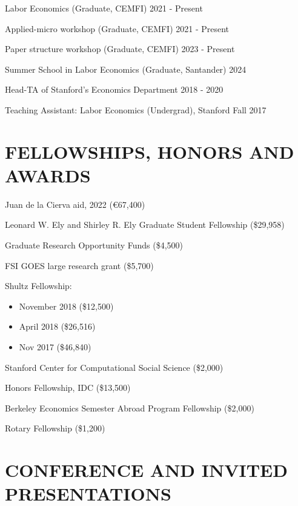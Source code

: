 \documentclass[margin]{res} %
\begin{document}
\begin{resume}
Labor Economics (Graduate, CEMFI) \hfill 2021 - Present

Applied-micro workshop (Graduate, CEMFI) \hfill 2021 - Present

Paper structure workshop (Graduate, CEMFI) \hfill 2023 - Present

Summer School in Labor Economics (Graduate, Santander) \hfill 2024

Head-TA of Stanford's Economics Department \hfill 2018 - 2020

Teaching Assistant: Labor Economics (Undergrad), Stanford \hfill Fall 2017



\section{FELLOWSHIPS, HONORS AND AWARDS}
		
		Juan de la Cierva aid, 2022 (\euro{67,400})

		 Leonard W. Ely and Shirley R. Ely Graduate Student Fellowship (\$29,958)

     Graduate Research Opportunity Funds (\$4,500)

     FSI GOES large research grant (\$5,700)

     Shultz Fellowship:
     \begin{itemize}
     	\item November 2018 (\$12,500)
     	\item April 2018 (\$26,516)
     	\item Nov 2017 (\$46,840)
     \end{itemize}

		 Stanford Center for Computational Social Science (\$2,000) 

		 Honors Fellowship, IDC (\$13,500) 

		 Berkeley Economics Semester Abroad Program Fellowship (\$2,000) 

		 Rotary Fellowship (\$1,200) 


 
\section{CONFERENCE AND INVITED PRESENTATIONS} 
\vspace{2em}


\end{resume}
\end{document}
